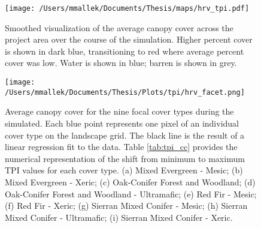 \begin{figure}[!htbp]
\centering
\texttt{[image: /Users/mmallek/Documents/Thesis/maps/hrv\_tpi.pdf]}
\caption{Smoothed visualization of the average canopy cover across the project area over the course of the simulation. Higher percent cover is shown in dark blue, transitioning to red where average percent cover was low. Water is shown in blue; barren is shown in grey.}
\label{fig:averagecc}
\end{figure}

\begin{figure}[!htbp]
\centering
\texttt{[image: /Users/mmallek/Documents/Thesis/Plots/tpi/hrv\_facet.png]}
\caption{Average canopy cover for the nine focal cover types during the simulated. Each blue point represents one pixel of an individual cover type on the landscape grid. The black line is the result of a linear regression fit to the data. Table \ref{tab:tpi_cc} provides the numerical representation of the shift from minimum to maximum TPI values for each cover type. (a) Mixed Evergreen - Mesic; (b) Mixed Evergreen - Xeric; (c) Oak-Conifer Forest and Woodland; (d) Oak-Conifer Forest and Woodland - Ultramafic; (e) Red Fir - Mesic; (f) Red Fir - Xeric; (g) Sierran Mixed Conifer - Mesic; (h) Sierran Mixed Conifer - Ultramafic; (i) Sierran Mixed Conifer - Xeric.} 
\label{fig:tpi_cc}
\end{figure}

